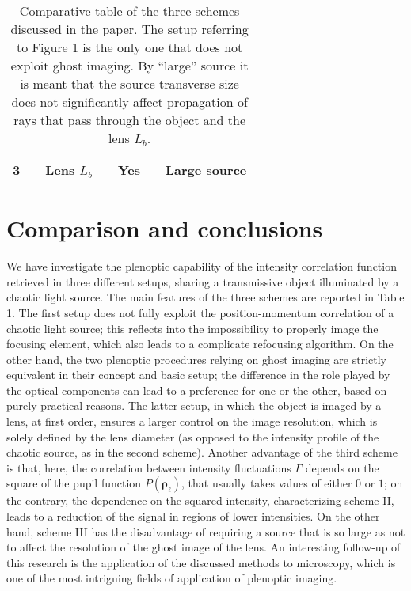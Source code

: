 \documentclass[aps,pra,amssymb,twocolumn,amsmath,superscriptaddress,showpacs,10pt]{revtex4-1}
\begin{document}
\begin{table}[]
\begin{tabular}{clclcll}
3                                                                 &  & Lens $L_b$                                                          &  & Yes                                                                      &  & \multicolumn{1}{c}{Large source}                                                                     \\ \hline
\end{tabular}
\caption{Comparative table of the three schemes discussed in the paper. The setup referring to Figure 1 is the only one that does not exploit ghost imaging. By ``large'' source it is meant that the source transverse size does not significantly affect propagation of rays that pass through the object and the lens $L_b$.}\label{table}
\end{table}


\section{Comparison and conclusions}

We have investigate the plenoptic capability of the intensity correlation function retrieved in three different setups, sharing a transmissive object illuminated by a chaotic light source. The main features of the three schemes are reported in Table 1. The first setup does not fully exploit the position-momentum correlation of a chaotic light source; this reflects into the impossibility to properly image the focusing element, which also leads to a complicate refocusing algorithm. On the other hand, the two plenoptic procedures relying on ghost imaging are strictly equivalent in their concept and basic setup; the difference in the role played by the optical components can lead to a preference for one or the other, based on purely practical reasons. The latter setup, in which the object is imaged by a lens, at first order, ensures a larger control on the image resolution, which is solely defined by the lens diameter (as opposed to the intensity profile of the chaotic source, as in the second scheme). Another advantage of the third scheme is that, here, the correlation between intensity fluctuations $\Gamma$ depends on the square of the pupil function $P(\bm{\rho}_{\ell})$, that usually takes values of either $0$ or $1$; on the contrary, the dependence on the squared intensity, characterizing scheme II, leads to a reduction of the signal in regions of lower intensities. On the other hand, scheme III has the disadvantage of requiring a source that is so large as not to affect the resolution of the ghost image of the lens. An interesting follow-up of this research is the application of the discussed methods to microscopy, which is one of the most intriguing fields of application of plenoptic imaging.
\end{document}
